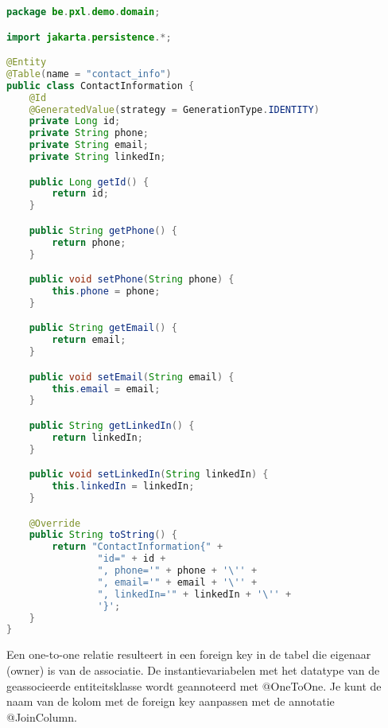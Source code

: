 \begin{lstlisting}[frame=single, language=java]
package be.pxl.demo.domain;

import jakarta.persistence.*;

@Entity
@Table(name = "contact_info")
public class ContactInformation {
    @Id
    @GeneratedValue(strategy = GenerationType.IDENTITY)
    private Long id;
    private String phone;
    private String email;
    private String linkedIn;

    public Long getId() {
        return id;
    }

    public String getPhone() {
        return phone;
    }

    public void setPhone(String phone) {
        this.phone = phone;
    }

    public String getEmail() {
        return email;
    }

    public void setEmail(String email) {
        this.email = email;
    }

    public String getLinkedIn() {
        return linkedIn;
    }

    public void setLinkedIn(String linkedIn) {
        this.linkedIn = linkedIn;
    }

    @Override
    public String toString() {
        return "ContactInformation{" +
                "id=" + id +
                ", phone='" + phone + '\'' +
                ", email='" + email + '\'' +
                ", linkedIn='" + linkedIn + '\'' +
                '}';
    }
}
\end{lstlisting}

Een one-to-one relatie resulteert in een foreign key in de tabel die eigenaar (owner) is van de associatie.
De instantievariabelen met het datatype van de geassocieerde entiteitsklasse wordt geannoteerd met @OneToOne.  Je kunt de naam van de kolom met de foreign key aanpassen met de annotatie @JoinColumn.

